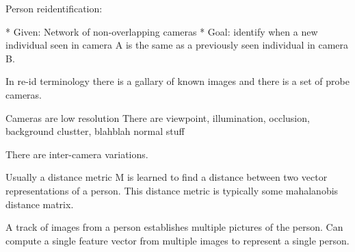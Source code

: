 
Person reidentification:

* Given: Network of non-overlapping cameras
* Goal: identify when a new individual seen in camera A is the same as a
previously seen individual in camera B. 

In re-id terminology there is a gallary of known images and there is a set of
probe cameras.

Cameras are low resolution
There are viewpoint, illumination, occlusion, background clustter, blahblah normal stuff

There are inter-camera variations. 

Usually a distance metric M is learned to find a distance between 
two vector representations of a person. 
This distance metric is typically some mahalanobis distance matrix.

A track of images from a person establishes multiple pictures of the person.
Can compute a single feature vector from multiple images to represent a single
person.

